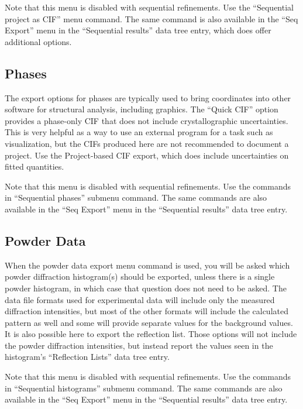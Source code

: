 Note that this menu is disabled with sequential refinements. Use the ``Sequential project as CIF'' menu command. The same command is also available in the ``Seq Export'' menu in the ``Sequential results'' data tree entry, which does offer additional options. 
\subsection{Phases}
The export options for phases are typically used to bring coordinates into other software for structural analysis, including graphics. The ``Quick CIF'' option provides a phase-only CIF that does not include crystallographic uncertainties. This is very helpful as a way to use an external program for a task such as visualization, but the CIFs produced here are not recommended to document a project. Use the Project-based CIF export, which does include uncertainties on fitted quantities.  

Note that this menu is disabled with sequential refinements. Use the commands in ``Sequential phases'' submenu command. The same commands are  also available in the ``Seq Export'' menu in the ``Sequential results'' data tree entry. 

\subsection{Powder Data}
When the powder data export menu command is used, you will be asked which powder diffraction histogram(s) should be exported, unless there is a single powder histogram, in which case that question does not need to be asked. The data file formats used for experimental data will include only the measured diffraction intensities, but most of the other formats will include the calculated pattern as well and some will provide separate values for the background values. It is also possible here to export the reflection list. Those options will not include the powder diffraction intensities, but instead report the values seen in the histogram's ``Reflection Lists'' data tree entry. 

Note that this menu is disabled with sequential refinements. Use the commands in ``Sequential histograms'' submenu command. The same commands are also available in the ``Seq Export'' menu in the ``Sequential results'' data tree entry. 
